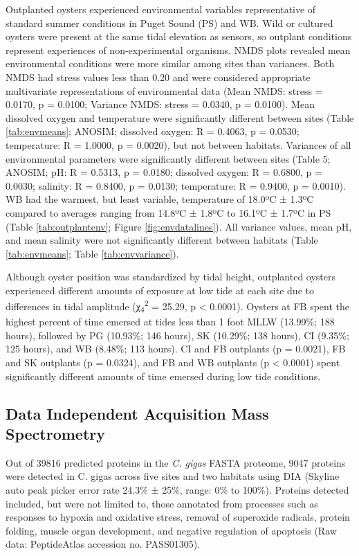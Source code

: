 \documentclass [11pt, proquest] {uwthesis}[2015/03/03]
\begin{document}
Outplanted oysters experienced environmental variables representative of standard summer conditions in Puget Sound (PS) and WB. Wild or cultured oysters were present at the same tidal elevation as sensors, so outplant conditions represent experiences of non-experimental organisms. NMDS plots revealed mean environmental conditions were more similar among sites than variances. Both NMDS had stress values less than 0.20 and were considered appropriate multivariate representations of environmental data (Mean NMDS: stress = 0.0170, p = 0.0100; Variance NMDS: stress = 0.0340, p = 0.0100). Mean dissolved oxygen and temperature were significantly different between sites (Table \ref{tab:envmeans}; ANOSIM; dissolved oxygen: R = 0.4063, p = 0.0530; temperature: R = 1.0000, p = 0.0020), but not between habitats. Variances of all environmental parameters were significantly different between sites (Table 5; ANOSIM; pH: R = 0.5313, p = 0.0180; dissolved oxygen: R = 0.6800, p = 0.0030; salinity: R = 0.8400, p = 0.0130; temperature: R = 0.9400, p = 0.0010). WB had the warmest, but least variable, temperature of 18.0ºC ± 1.3ºC compared to averages ranging from 14.8ºC ± 1.8ºC to 16.1ºC ± 1.7ºC in PS (Table \ref{tab:outplantenv}; Figure \ref{fig:envdatalines}). All variance values, mean pH, and mean salinity were not significantly different between habitats (Table \ref{tab:envmeans}; Table \ref{tab:envvariance}).

Although oyster position was standardized by tidal height, outplanted oysters experienced different amounts of exposure at low tide at each site due to differences in tidal amplitude (χ\textsubscript{4}\textsuperscript{2} = 25.29, p \textless{} 0.0001). Oysters at FB spent the highest percent of time emersed at tides less than 1 foot MLLW (13.99\%; 188 hours), followed by PG (10.93\%; 146 hours), SK (10.29\%; 138 hours), CI (9.35\%; 125 hours), and WB (8.48\%; 113 hours). CI and FB outplants (p = 0.0021), FB and SK outplants (p = 0.0324), and FB and WB outplants (p \textless{} 0.0001) spent significantly different amounts of time emersed during low tide conditions.

\hypertarget{data-independent-acquisition-mass-spectrometry-1}{%
\subsection{Data Independent Acquisition Mass Spectrometry}\label{data-independent-acquisition-mass-spectrometry-1}}

Out of 39816 predicted proteins in the \emph{C. gigas} FASTA proteome, 9047 proteins were detected in C. gigas across five sites and two habitats using DIA (Skyline auto peak picker error rate 24.3\% ± 25\%, range: 0\% to 100\%). Proteins detected included, but were not limited to, those annotated from processes such as responses to hypoxia and oxidative stress, removal of superoxide radicals, protein folding, muscle organ development, and negative regulation of apoptosis (Raw data: PeptideAtlas accession no. PASS01305).
\end{document}
